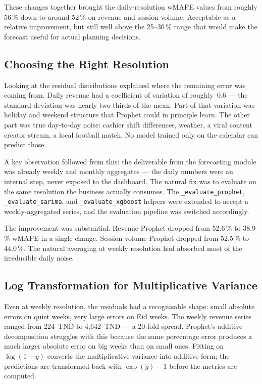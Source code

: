 These changes together brought the daily-resolution wMAPE values from roughly
56\,\% down to around 52\,\% on revenue and session volume. Acceptable as a
relative improvement, but still well above the 25--30\,\% range that would
make the forecast useful for actual planning decisions.

\subsection{Choosing the Right Resolution}

Looking at the residual distributions explained where the remaining error was
coming from. Daily revenue had a coefficient of variation of roughly~0.6 ---
the standard deviation was nearly two-thirds of the mean. Part of that
variation was holiday and weekend structure that Prophet could in principle
learn. The other part was true day-to-day noise: cashier shift differences,
weather, a viral content creator stream, a local football match. No model
trained only on the calendar can predict those.

A key observation followed from this: the deliverable from the forecasting
module was already weekly and monthly aggregates --- the daily numbers were
an internal step, never exposed to the dashboard. The natural fix was to
evaluate on the same resolution the business actually consumes. The
\texttt{\_evaluate\_prophet}, \texttt{\_evaluate\_sarima}, and
\texttt{\_evaluate\_xgboost} helpers were extended to accept a weekly-aggregated
series, and the evaluation pipeline was switched accordingly.

The improvement was substantial. Revenue Prophet dropped from 52.6\,\% to
38.9\,\% wMAPE in a single change. Session volume Prophet dropped from
52.5\,\% to 44.0\,\%. The natural averaging at weekly resolution had absorbed
most of the irreducible daily noise.

\subsection{Log Transformation for Multiplicative Variance}

Even at weekly resolution, the residuals had a recognisable shape: small
absolute errors on quiet weeks, very large errors on Eid weeks. The weekly
revenue series ranged from 224~TND to 4{,}642~TND --- a 20-fold spread.
Prophet's additive decomposition struggles with this because the same
percentage error produces a much larger absolute error on big weeks than
on small ones. Fitting on $\log(1+y)$ converts the multiplicative variance
into additive form; the predictions are transformed back with $\exp(\hat{y})-1$
before the metrics are computed.

